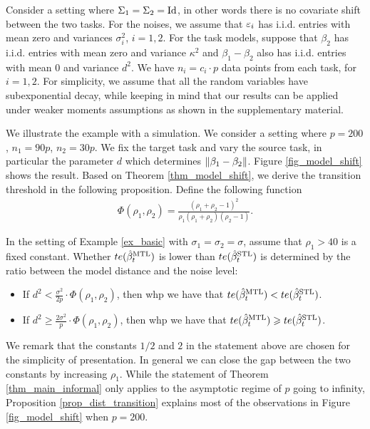 \begin{example}\label{ex_basic}
	Consider a setting where $\Sigma_1 = \Sigma_2 = \operatorname{Id}$, in other words there is no covariate shift between the two tasks. For the noises, we assume that ${\varepsilon}_i$ has i.i.d. entries with mean zero and variances $\sigma_i^2$, $i=1,2$. 
	For the task models, suppose that $\beta_2$ has i.i.d. entries with mean zero and variance $\kappa^2$ and $\beta_1 - \beta_2$ also has i.i.d. entries with mean $0$ and variance $d^2$.
	We have $n_i = c_i \cdot p$ data points from each task, for $i = 1, 2$.
	For simplicity, we assume that all the random variables have subexponential decay, while keeping in mind that our results can be applied under weaker moments assumptions as shown in the supplementary material.
\end{example}

We illustrate the example with a simulation.
We consider a setting where $p = 200$, $n_1 = 90p$, $n_2 = 30p$.
We fix the target task and vary the source task, in particular the parameter $d$ which determines $\|\beta_1 - \beta_2\|$.
Figure \ref{fig_model_shift} shows the result.
Based on Theorem \ref{thm_model_shift}, we derive the transition threshold in the following proposition.
Define the following function
\begin{align*}
	\Phi(\rho_1, \rho_2) = \frac{(\rho_1 + \rho_2 - 1)^2}{\rho_1 (\rho_1 + \rho_2) (\rho_2 - 1)}.
\end{align*}

\begin{proposition}\label{prop_dist_transition}
	In the setting of Example \ref{ex_basic} with $\sigma_1 = \sigma_2 = \sigma$, assume that $\rho_1 > 40$ is a fixed constant.
	Whether $te(\hat{\beta}_t^{\text{MTL}})$ is lower than $te(\hat{\beta}_t^{\text{STL}})$ is determined by the ratio between the model distance and the noise level:
	\begin{itemize}
		\item If ${d^2} < \frac {\sigma^2} {2p} \cdot \Phi(\rho_1, \rho_2)$, then whp we have that $te(\hat{\beta}_t^{\text{MTL}}) < te(\hat{\beta}_t^{\text{STL}})$.
		\item If ${d^2} \ge \frac {2\sigma^2} {p} \cdot \Phi(\rho_1, \rho_2)$, then whp we have that $te(\hat{\beta}_t^{\text{MTL}}) \geqslant te(\hat{\beta}_t^{\text{STL}})$.
	\end{itemize}
\end{proposition}

We remark that the constants $1/2$ and $2$ in the statement above are chosen for the simplicity of presentation.
In general we can close the gap between the two constants by increasing $\rho_1$.
While the statement of Theorem \ref{thm_main_informal} only applies to the asymptotic regime of $p$ going to infinity, Proposition \ref{prop_dist_transition} explains most of the observations in Figure \ref{fig_model_shift} when $p = 200$.

